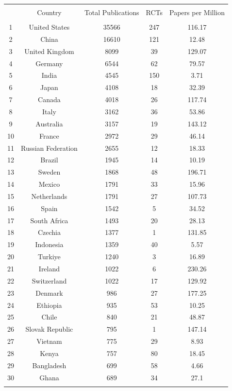 

\begin{tabular}{@{\extracolsep{5pt}} ccccc} 
\\[-1.8ex]\hline 
\hline \\[-1.8ex] 
 & Country & Total Publications & RCTs & Papers per Million \\ 
\hline \\[-1.8ex] 
1 & United States & 35566 & 247 & 116.17 \\ 
2 & China & 16610 & 121 & 12.48 \\ 
3 & United Kingdom & 8099 & 39 & 129.07 \\ 
4 & Germany & 6544 & 62 & 79.57 \\ 
5 & India & 4545 & 150 & 3.71 \\ 
6 & Japan & 4108 & 18 & 32.39 \\ 
7 & Canada & 4018 & 26 & 117.74 \\ 
8 & Italy & 3162 & 36 & 53.86 \\ 
9 & Australia & 3157 & 19 & 143.12 \\ 
10 & France & 2972 & 29 & 46.14 \\ 
11 & Russian Federation & 2655 & 12 & 18.33 \\ 
12 & Brazil & 1945 & 14 & 10.19 \\ 
13 & Sweden & 1868 & 48 & 196.71 \\ 
14 & Mexico & 1791 & 33 & 15.96 \\ 
15 & Netherlands & 1791 & 27 & 107.73 \\ 
16 & Spain & 1542 & 5 & 34.52 \\ 
17 & South Africa & 1493 & 20 & 28.13 \\ 
18 & Czechia & 1377 & 1 & 131.85 \\ 
19 & Indonesia & 1359 & 40 & 5.57 \\ 
20 & Turkiye & 1240 & 3 & 16.89 \\ 
21 & Ireland & 1022 & 6 & 230.26 \\ 
22 & Switzerland & 1022 & 17 & 129.92 \\ 
23 & Denmark & 986 & 27 & 177.25 \\ 
24 & Ethiopia & 935 & 53 & 10.25 \\ 
25 & Chile & 840 & 21 & 48.87 \\ 
26 & Slovak Republic & 795 & 1 & 147.14 \\ 
27 & Vietnam & 775 & 29 & 8.93 \\ 
28 & Kenya & 757 & 80 & 18.45 \\ 
29 & Bangladesh & 699 & 58 & 4.66 \\ 
30 & Ghana & 689 & 34 & 27.1 \\ 
\hline \\[-1.8ex] 
\end{tabular} 



